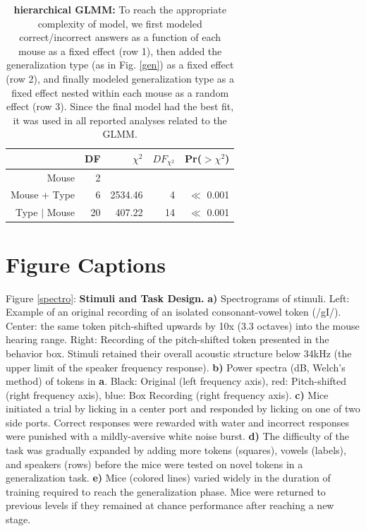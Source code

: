 \documentclass[preprint, NumberedRefs]{JASAnew}\usepackage[]{graphicx}\usepackage[]{color}
\begin{document}
\newpage
\begin{table}
\label{hiertab}
\caption{\textbf{hierarchical GLMM:} To reach the appropriate complexity of model, we first modeled correct/incorrect answers as a function of each mouse as a fixed effect (row 1), then added the generalization type (as in Fig. \ref{gen}) as a fixed effect (row 2), and finally modeled generalization type as a fixed effect nested within each mouse as a random effect (row 3). Since the final model had the best fit, it was used in all reported analyses related to the GLMM.}
\begin{ruledtabular}
\begin{tabular}{rrrrr}
  \hline
 & DF & $\chi^2$ & $DF_{\chi^2}$ & Pr($>\chi^2$) \\ 
  \hline
Mouse & 2 &  &  &  \\ 
  Mouse + Type & 6 & 2534.46 & 4 & $\ll$ 0.001 \\ 
  Type $|$ Mouse & 20 & 407.22 & 14 & $\ll$ 0.001 \\ 
   \hline
\end{tabular}

\end{ruledtabular}
\end{table}
\clearpage

\section{Figure Captions}

Figure \ref{spectro}: \textbf{Stimuli and Task Design.} \textbf{a)} Spectrograms of stimuli. Left: Example of an original recording of an isolated consonant-vowel token (/gI/). Center: the same token pitch-shifted upwards by 10x (3.3 octaves) into the mouse hearing range. Right: Recording of the pitch-shifted token presented in the behavior box. Stimuli retained their overall acoustic structure below 34kHz (the upper limit of the speaker frequency response). \textbf{b)} Power spectra (dB, Welch's method) of tokens in \textbf{a}. Black: Original (left frequency axis), red: Pitch-shifted (right frequency axis), blue: Box Recording (right frequency axis). \textbf{c)} Mice initiated a trial by licking in a center port and responded by licking on one of two side ports. Correct responses were rewarded with water and incorrect responses were punished with a mildly-aversive white noise burst. \textbf{d)} The difficulty of the task was gradually expanded by adding more tokens (squares), vowels (labels), and speakers (rows) before the mice were tested on novel tokens in a generalization task. \textbf{e)} Mice (colored lines) varied widely in the duration of training required to reach the generalization phase. Mice were returned to previous levels if they remained at chance performance after reaching a new stage.
\end{document}
